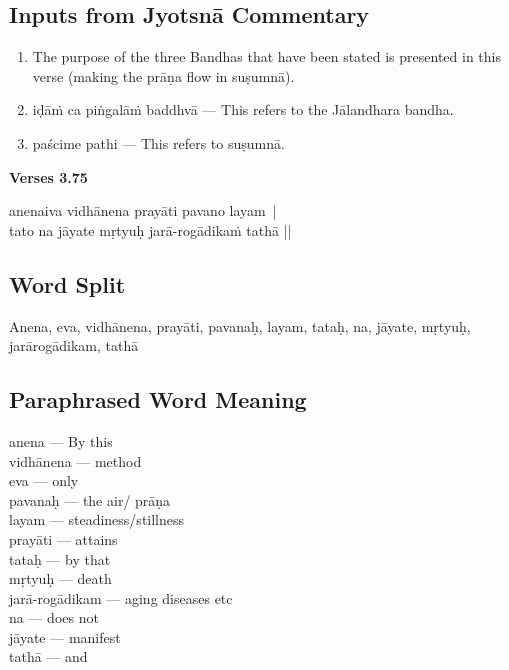 \subsection*{Inputs from Jyotsnā Commentary}
\vspace{-5pt}

\begin{enumerate}
\itemsep=0pt
\item The purpose of the three Bandhas that have been stated is presented  in this verse (making the prāṇa flow in suṣumnā). 
\item iḍāṁ ca piṅgalāṁ baddhvā --- This refers to the Jālandhara bandha. 
\item paścime pathi --- This refers to suṣumnā.
\end{enumerate}


\noindent \textbf{Verses 3.75}

\begin{shloka}
anenaiva vidhānena prayāti pavano layam |\\
tato na jāyate mṛtyuḥ jarā-rogādikaṁ tathā ||
\end{shloka}
 
\subsection*{Word Split}

Anena, eva, vidhānena, prayāti, pavanaḥ, layam, tataḥ, na, jāyate, mṛtyuḥ, jarārogādikam, tathā

\subsection*{Paraphrased Word Meaning}

\begin{multicols}{2}
anena  --- By this \\
vidhānena ---  method \\
eva ---  only\\
pavanaḥ ---  the air/ prāṇa\\
layam ---  steadiness/stillness  \\
prayāti --- attains \\
tataḥ ---  by that \\
mṛtyuḥ ---  death\\
jarā-rogādikam --- aging diseases etc \\
na --- does not   \\
jāyate ---  manifest \\
tathā --- and 
\end{multicols}

